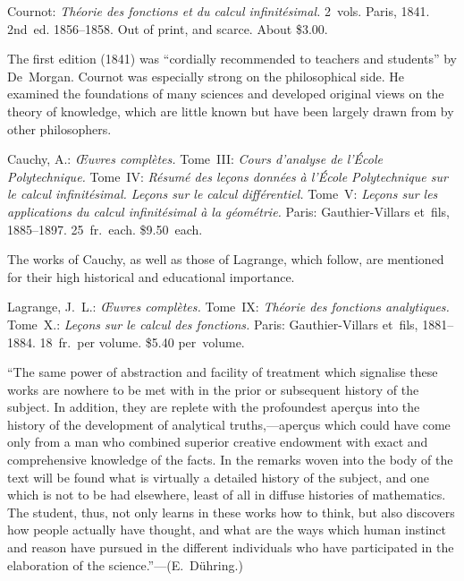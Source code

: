 \documentclass[12pt]{book}[2005/09/16]
\newlength{\ParIndent}
\newenvironment{Book}{\medskip\par\noindent\hangindent\ParIndent\ignorespaces}{\par}
\newenvironment{Descrip}{%
  \begin{list}{}{%
      \setlength{\leftmargin}{1.5\ParIndent}%
      \setlength{\itemindent}{\ParIndent}%
      \setlength{\listparindent}{\ParIndent}%
      \setlength{\topsep}{4pt}%
      \item\small\ignorespaces%
  }%
}{%
\end{list}}
\newcommand{\Pagelabel}[1]{\phantomsection\label{page:#1}}
\newcommand{\PageSep}[1]{\Pagelabel{#1}\ignorespaces}
\renewcommand{\(}{{\upshape(}}
\renewcommand{\)}{{\upshape)}}
\newcommand{\Title}[1]{\textit{#1}}
\begin{document}
\begin{Book}
Cournot: \Title{Théorie des fonctions et du calcul infinitésimal.} 2~vols.
Paris, 1841. 2nd~ed. 1856--1858. Out of print, and
scarce. About \$3.00.

\begin{Descrip}
The first edition (1841) was ``cordially recommended to teachers
and students'' by De~Morgan. Cournot was especially strong on the
philosophical side. He examined the foundations of many sciences
and developed original views on the theory of knowledge, which are
little known but have been largely drawn from by other philosophers.
\end{Descrip}
\end{Book}

\begin{Book}
Cauchy, A.: \Title{\OE{}uvres complètes.} Tome~III: \Title{Cours d'analyse
de l'École Polytechnique.} Tome~IV: \Title{Résumé des leçons
données à l'École Polytechnique sur le calcul infinitésimal.
Leçons sur le calcul différentiel.} Tome~V: \Title{Leçons sur les
applications du calcul infinitésimal à la géométrie.} Paris:
Gauthier-Villars et~fils, 1885--1897. 25~fr.\ each. \$9.50~each.

\begin{Descrip}
The works of Cauchy, as well as those of Lagrange, which follow,
are mentioned for their high historical and educational importance.
\end{Descrip}
\end{Book}

\begin{Book}
Lagrange, J.~L.: \Title{\OE{}uvres complètes.} Tome~IX: \Title{Théorie des fonctions
analytiques.} Tome~X.: \Title{Leçons sur le calcul des fonctions.}
\PageSep{140}
Paris: Gauthier-Villars et~fils, 1881--1884. 18~fr.\ per
volume. \$5.40 per~volume.

\begin{Descrip}
``The same power of abstraction and facility of treatment which
signalise these works are nowhere to be met with in the prior or subsequent
history of the subject. In addition, they are replete with the
profoundest aperçus into the history of the development of analytical
truths,---aperçus which could have come only from a man who combined
superior creative endowment with exact and comprehensive
knowledge of the facts. In the remarks woven into the body of the
text will be found what is virtually a detailed history of the subject,
and one which is not to be had elsewhere, least of all in diffuse histories
of mathematics. The student, thus, not only learns in these
works how to think, but also discovers how people actually have
thought, and what are the ways which human instinct and reason
have pursued in the different individuals who have participated in
the elaboration of the science.''---(E.~Dühring.)
\end{Descrip}
\end{Book}
\end{document}
